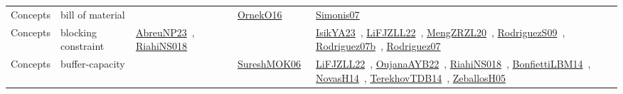 {\begin{longtable}{lp{3cm}>{\raggedright\arraybackslash}p{6cm}>{\raggedright\arraybackslash}p{6cm}>{\raggedright\arraybackslash}p{8cm}}
Concepts & bill of material &  & \href{../works/OrnekO16.pdf}{OrnekO16}~\cite{OrnekO16} & \href{../works/Simonis07.pdf}{Simonis07}~\cite{Simonis07}\\
Concepts & blocking constraint & \href{../works/AbreuNP23.pdf}{AbreuNP23}~\cite{AbreuNP23}, \href{../works/RiahiNS018.pdf}{RiahiNS018}~\cite{RiahiNS018} &  & \href{../works/IsikYA23.pdf}{IsikYA23}~\cite{IsikYA23}, \href{../works/LiFJZLL22.pdf}{LiFJZLL22}~\cite{LiFJZLL22}, \href{../works/MengZRZL20.pdf}{MengZRZL20}~\cite{MengZRZL20}, \href{../works/RodriguezS09.pdf}{RodriguezS09}~\cite{RodriguezS09}, \href{../works/Rodriguez07b.pdf}{Rodriguez07b}~\cite{Rodriguez07b}, \href{../works/Rodriguez07.pdf}{Rodriguez07}~\cite{Rodriguez07}\\
Concepts & buffer-capacity &  & \href{../works/SureshMOK06.pdf}{SureshMOK06}~\cite{SureshMOK06} & \href{../works/LiFJZLL22.pdf}{LiFJZLL22}~\cite{LiFJZLL22}, \href{../works/OujanaAYB22.pdf}{OujanaAYB22}~\cite{OujanaAYB22}, \href{../works/RiahiNS018.pdf}{RiahiNS018}~\cite{RiahiNS018}, \href{../works/BonfiettiLBM14.pdf}{BonfiettiLBM14}~\cite{BonfiettiLBM14}, \href{../works/NovasH14.pdf}{NovasH14}~\cite{NovasH14}, \href{../works/TerekhovTDB14.pdf}{TerekhovTDB14}~\cite{TerekhovTDB14}, \href{../works/ZeballosH05.pdf}{ZeballosH05}~\cite{ZeballosH05}\\

\end{longtable}}
